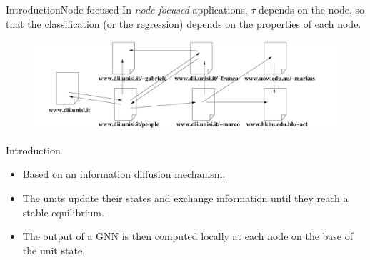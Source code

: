 \documentclass[10pt,aspectratio=169]{beamer}
\begin{document}
\begin{frame}{Introduction}{Node-focused}
    In \emph{node-focused} applications, $\tau$ depends on the node, so that the classification (or the regression) depends on the properties of each node.

    \begin{figure}
        \centering
        \includegraphics[width=.8\textwidth]{pic/website.png}        
    \end{figure}
\end{frame}

\begin{frame}{Introduction}
    \begin{itemize}
        \item Based on an information diffusion mechanism.
        \item The units update their states and exchange information until they reach a stable equilibrium.
        \item The output of a GNN is then computed locally at each node on the base of the unit state.
    \end{itemize}
\end{frame}
\end{document}
